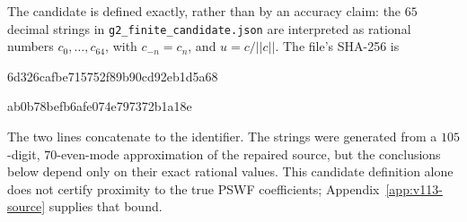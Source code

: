 \documentclass[11pt]{article}
\def\norm#1{||#1||}%
\theoremstyle{remark}
\newcommand{\norm}[1]{\left\lVert #1\right\rVert}
\begin{document}
The candidate is defined exactly, rather than by an accuracy claim:
the $65$ decimal strings in \texttt{g2\_finite\_candidate.json} are
interpreted as rational numbers $c_0,\ldots,c_{64}$, with
$c_{-n}=c_n$, and $u=c/\norm c$. The file's SHA-256 is
\begin{center}\ttfamily\small
6d326cafbe715752f89b90cd92eb1d5a68\par
ab0b78befb6afe074e797372b1a18e
\end{center}
The two lines concatenate to the identifier. The strings were generated
from a $105$-digit, $70$-even-mode approximation of the repaired source,
but the conclusions below depend only on their exact rational values.
This candidate definition alone does not certify proximity to the true
PSWF coefficients; Appendix~\ref{app:v113-source} supplies that bound.
\end{document}
